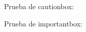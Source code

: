 \documentclass{yukibook}
\begin{document}
Prueba de cautionbox:
\cautionbox{\Blindtext[1]}

Prueba de importantbox:
\importantbox{\Blindtext[1]}


\begin{info-box}
  \notebox{\Blindtext[1]}
\end{info-box}
\begin{warning-box}
  \Blindtext[1]
\end{warning-box}
\begin{error-box}
  \Blindtext[1]
\end{error-box}

\Blinddocument
\end{document}
